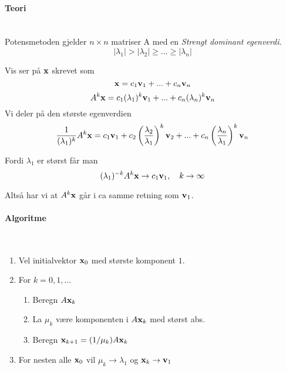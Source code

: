 \paragraph{Teori} \hfill \\
Potensmetoden gjelder $n\times n$ matriser A
med en \emph{Strengt dominant egenverdi}.
$$|\lambda_1| > |\lambda_2| \geq ... \geq |\lambda_n|$$

Vis ser på $\mathbf{x}$ skrevet som
$$\mathbf{x} = c_1\mathbf{v}_1 + ... + c_n\mathbf{v}_n$$
$$A^k\mathbf{x} = c_1(\lambda_1)^k\mathbf{v}_1 + ... + c_n(\lambda_n)^k\mathbf{v}_n$$
Vi deler på den største egenverdien
$$\frac{1}{(\lambda_1)^k} A^k \mathbf{x}
  = c_1\mathbf{v}_1
    + c_2\left(\frac{\lambda_2}{\lambda_1}\right)^k\mathbf{v}_2
    + ...
    + c_n\left(\frac{\lambda_n}{\lambda_1}\right)^k\mathbf{v}_n$$

Fordi $\lambda_1$ er størst får man
$$(\lambda_1)^{-k} A^k \mathbf{x} \to c_1\mathbf{v}_1,\quad k\to\infty$$

Altså har vi at $A^k\mathbf{x}$ går i ca samme retning som $\mathbf{v}_1$.



\paragraph{Algoritme} \hfill \\
\begin{enumerate}
  \item Vel initialvektor $\mathbf{x}_0$ med største komponent $1$.
  \item For $k = 0,1,...$
    \begin{enumerate}[label=\alph*]
      \item Beregn $A\mathbf{x}_k$
      \item La $\mu_k$ være komponenten i $A\mathbf{x}_k$ med størst abs.
      \item Beregn $\mathbf{x}_{k+1} = (1/\mu_k)A\mathbf{x}_k$
    \end{enumerate}
  \item For nesten alle $\mathbf{x}_0$ vil
        $\mu_k \to \lambda_1$ og $\mathbf{x}_k \to \mathbf{v}_1$
\end{enumerate}
